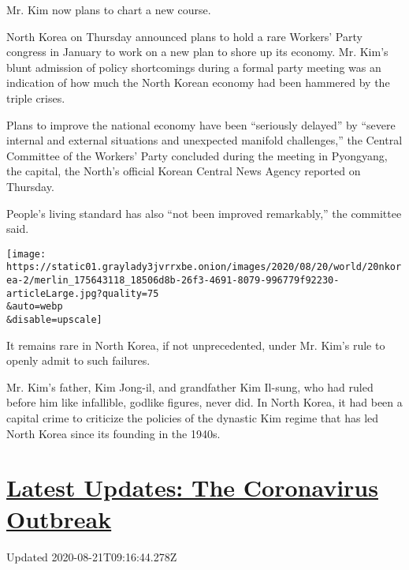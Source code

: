 Mr. Kim now plans to chart a new course.

North Korea on Thursday announced plans to hold a rare Workers' Party
congress in January to work on a new plan to shore up its economy. Mr.
Kim's blunt admission of policy shortcomings during a formal party
meeting was an indication of how much the North Korean economy had been
hammered by the triple crises.

Plans to improve the national economy have been ``seriously delayed'' by
``severe internal and external situations and unexpected manifold
challenges,'' the Central Committee of the Workers' Party concluded
during the meeting in Pyongyang, the capital, the North's official
Korean Central News Agency reported on Thursday.

People's living standard has also ``not been improved remarkably,'' the
committee said.

\texttt{[image: https://static01.graylady3jvrrxbe.onion/images/2020/08/20/world/20nkorea-2/merlin\_175643118\_18506d8b-26f3-4691-8079-996779f92230-articleLarge.jpg?quality=75\\\&auto=webp\\\&disable=upscale]}

It remains rare in North Korea, if not unprecedented, under Mr. Kim's
rule to openly admit to such failures.

Mr. Kim's father, Kim Jong-il, and grandfather Kim Il-sung, who had
ruled before him like infallible, godlike figures, never did. In North
Korea, it had been a capital crime to criticize the policies of the
dynastic Kim regime that has led North Korea since its founding in the
1940s.

\hypertarget{latest-updates-the-coronavirus-outbreak}{%
\section{\texorpdfstring{\href{https://www.nytimes3xbfgragh.onion/2020/08/21/world/covid-19-coronavirus.html?action=click\&pgtype=Article\&state=default\&region=MAIN_CONTENT_1\&context=storylines_live_updates}{Latest
Updates: The Coronavirus
Outbreak}}{Latest Updates: The Coronavirus Outbreak}}\label{latest-updates-the-coronavirus-outbreak}}

Updated 2020-08-21T09:16:44.278Z

